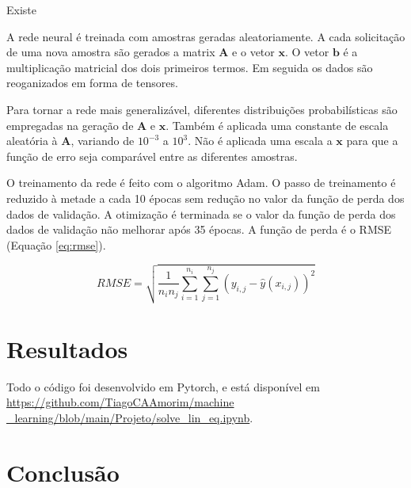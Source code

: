 \documentclass[final,5p]{elsarticle}
\numberwithin{equation}{section}
\begin{document}
    Existe

    A rede neural é treinada com amostras geradas aleatoriamente. A cada solicitação de uma nova amostra são gerados a matrix $\textbf{A}$ e o vetor $\textbf{x}$. O vetor $\textbf{b}$ é a multiplicação matricial dos dois primeiros termos. Em seguida os dados são reoganizados em forma de tensores.

    Para tornar a rede mais generalizável, diferentes distribuições probabilísticas são empregadas na geração de $\textbf{A}$ e $\textbf{x}$. Também é aplicada uma constante de escala aleatória à $\textbf{A}$, variando de $10^{-3}$ a $10^3$. Não é aplicada uma escala a $\textbf{x}$ para que a função de erro seja comparável entre as diferentes amostras.

    O treinamento da rede é feito com o algoritmo Adam. O passo de treinamento é reduzido à metade a cada 10 épocas sem redução no valor da função de perda dos dados de validação. A otimização é terminada se o valor da função de perda dos dados de validação não melhorar após 35 épocas.
    A função de perda é o RMSE (Equação \ref{eq:rmse}).

    \begin{equation}
        RMSE = \sqrt{\frac{1}{n_in_j}\sum_{i=1}^{n_i} \sum_{j=1}^{n_j} (y_{i,j} - \hat{y}(x_{i,j}))^2} \label{eq:rmse}
    \end{equation}



\section{Resultados}





    Todo o código foi desenvolvido em Pytorch, e está disponível em \href{https://github.com/TiagoCAAmorim/machine\_learning/blob/main/Projeto/solve_lin_eq.ipynb}{https://github.com/TiagoCAAmorim/machine \_learning/blob/main/Projeto/solve\_lin\_eq.ipynb}.


    \section{Conclusão}




\end{document}
